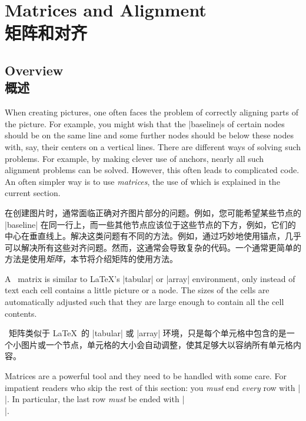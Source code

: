 \setcounter{section}{19}
\setcounter{subsection}{10}
\setcounter{subsubsection}{3}
%
%
%


\section{Matrices and Alignment\\矩阵和对齐}
\label{section-matrices}

\subsection{Overview\\概述}

When creating pictures, one often faces the problem of correctly aligning parts
of the picture. For example, you might wish that the |baseline|s of certain
nodes should be on the same line and some further nodes should be below these
nodes with, say, their centers on a vertical lines. There are different ways of
solving such problems. For example, by making clever use of anchors, nearly all
such alignment problems can be solved. However, this often leads to complicated
code. An often simpler way is to use \emph{matrices}, the use of which is
explained in the current section.

在创建图片时，通常面临正确对齐图片部分的问题。例如，您可能希望某些节点的 |baseline| 在同一行上，而一些其他节点应该位于这些节点的下方，例如，它们的中心在垂直线上。解决这类问题有不同的方法。例如，通过巧妙地使用锚点，几乎可以解决所有这些对齐问题。然而，这通常会导致复杂的代码。一个通常更简单的方法是使用\emph{矩阵}，本节将介绍矩阵的使用方法。

A \tikzname\ matrix is similar to \LaTeX's |{tabular}| or |{array}|
environment, only instead of text each cell contains a little picture or a
node. The sizes of the cells are automatically adjusted such that they are
large enough to contain all the cell contents.

\tikzname\ 矩阵类似于 \LaTeX\ 的 |{tabular}| 或 |{array}| 环境，只是每个单元格中包含的是一个小图片或一个节点，单元格的大小会自动调整，使其足够大以容纳所有单元格内容。

Matrices are a powerful tool and they need to be handled with some care. For
impatient readers who skip the rest of this section: you \emph{must} end
\emph{every} row with |\\|. In particular, the last row \emph{must} be ended
with |\\|.

